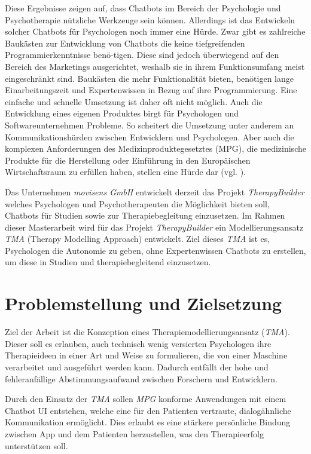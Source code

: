 Diese Ergebnisse zeigen auf, dass Chatbots im Bereich der Psychologie und Psychotherapie nützliche Werkzeuge sein können. Allerdings ist das Entwickeln solcher Chatbots für Psychologen noch immer eine Hürde. Zwar gibt es zahlreiche Baukästen zur Entwicklung von Chatbots die keine tiefgreifenden Programmierkenntnisse benö-tigen. Diese sind jedoch überwiegend auf den Bereich des Marketings ausgerichtet, weshalb sie in ihrem Funktionsumfang meist eingeschränkt sind. Baukästen die mehr Funktionalität bieten, benötigen lange Einarbeitungszeit und Expertenwissen in Bezug auf ihre Programmierung. Eine einfache und schnelle Umsetzung ist daher oft nicht möglich. Auch die Entwicklung eines eigenen Produktes birgt für Psychologen und Softwareunternehmen Probleme. So scheitert die Umsetzung unter anderem an Kommunikationshürden zwischen Entwicklern und Psychologen. Aber auch die komplexen Anforderungen des Medizinproduktegesetztes (MPG), die medizinische Produkte für die Herstellung oder Einführung in den Europäischen Wirtschaftsraum zu erfüllen haben, stellen eine Hürde dar (vgl. \cite{MPGnicht8:online}).  

Das Unternehmen \emph{movisens GmbH} entwickelt derzeit das Projekt \emph{TherapyBuilder} welches Psychologen und Psychotherapeuten die Möglichkeit bieten soll, Chatbots  für Studien sowie zur Therapiebegleitung einzusetzen. Im Rahmen dieser Masterarbeit wird für das Projekt \emph{TherapyBuilder} ein Modellierungsansatz \emph{TMA} (Therapy Modelling Approach) entwickelt. Ziel dieses \emph{TMA} ist es, Psychologen die Autonomie zu geben, ohne Expertenwissen Chatbots zu erstellen, um diese in Studien und therapiebegleitend einzusetzen.


\section{Problemstellung und Zielsetzung}

Ziel der Arbeit ist die Konzeption eines Therapiemodellierungsansatz (\emph{TMA}). Dieser soll es erlauben, auch technisch wenig versierten Psychologen ihre Therapieideen in einer Art und Weise zu formulieren, die von einer Maschine verarbeitet und ausgeführt werden kann. Dadurch entfällt der hohe und fehleranfällige Abstimmungsaufwand zwischen Forschern und Entwicklern. 

Durch den Einsatz der \emph{TMA} sollen \emph{MPG} konforme Anwendungen mit einem Chatbot UI entstehen, welche eine für den Patienten vertraute, dialogähnliche Kommunikation ermöglicht. Dies erlaubt es eine stärkere persönliche Bindung zwischen App und dem Patienten herzustellen, was den Therapieerfolg unterstützen soll. 

